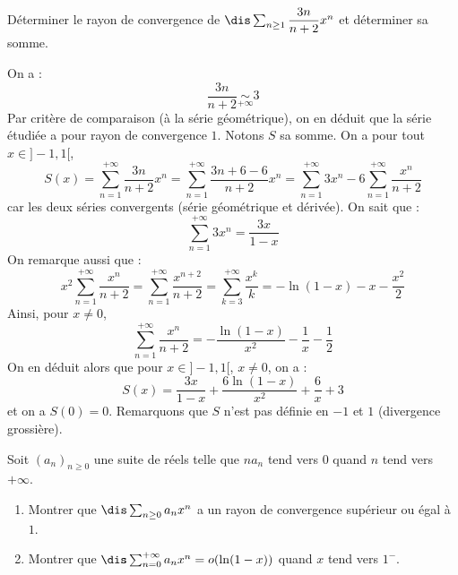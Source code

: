 \documentclass[a4paper,10pt]{report}
\begin{document}
\begin{Exercice}{} Déterminer le rayon de convergence de $\dis \sum_{n \geq 1} \dfrac{3n}{n+2} x^n$ et déterminer sa somme.
\end{Exercice}

\corr On a :
$$  \dfrac{3n}{n+2} \underset{+ \infty}{\sim} 3$$
Par critère de comparaison (à la série géométrique), on en déduit que la série étudiée a pour rayon de convergence $1$. Notons $S$ sa somme. On a pour tout $x \in ]-1,1[$,
$$ S(x) = \sum_{n=1}^{+ \infty}  \dfrac{3n}{n+2} x^n = \sum_{n=1}^{+ \infty}  \dfrac{3n+6-6}{n+2} x^n = \sum_{n=1}^{+ \infty} 3x^n - 6 \sum_{n=1}^{+ \infty} \dfrac{x^n}{n+2}$$
car les deux séries convergents (série géométrique et dérivée). On sait que :
$$ \sum_{n=1}^{+ \infty} 3x^n = \dfrac{3x}{1-x}$$
On remarque aussi que :
$$ x^2 \sum_{n=1}^{+ \infty} \dfrac{x^n}{n+2} = \sum_{n=1}^{+ \infty} \dfrac{x^{n+2}}{n+2} = \sum_{k=3}^{+\infty} \dfrac{x^k}{k} = - \ln(1-x) -x - \dfrac{x^2}{2}   $$
Ainsi, pour $x \neq 0$,
$$ \sum_{n=1}^{+ \infty} \dfrac{x^n}{n+2} = - \dfrac{\ln(1-x)}{x^2} - \dfrac{1}{x} - \dfrac{1}{2}$$
On en déduit alors que pour $x \in ]-1,1[$, $x \neq 0$, on a :
$$ S(x) =  \dfrac{3x}{1-x}  + \dfrac{6\ln(1-x)}{x^2} + \dfrac{6}{x} +3$$
et on a $S(0)= 0$. Remarquons que $S$ n'est pas définie en $-1$ et $1$ (divergence grossière).


\begin{Exercice}{} Soit $(a_n)_{n \geq 0}$ une suite de réels telle que $na_n$ tend vers $0$ quand $n$ tend vers $+ \infty$.
\begin{enumerate}
\item Montrer que $\dis \sum_{n \geq 0} a_n x^n$ a un rayon de convergence supérieur ou égal à $1$.
\item Montrer que $\dis \sum_{n=0}^{+ \infty} a_n x^n = o(\ln(1-x))$ quand $x$ tend vers $1^{-}$.
\end{enumerate}
\end{Exercice}
\end{document}
